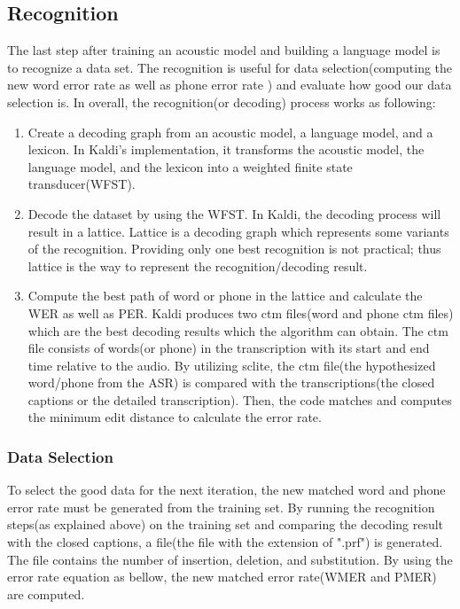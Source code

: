 \subsection{Recognition}
The last step after training an acoustic model and building a language model is to recognize a data set. The recognition is useful for data selection(computing the new word error rate as well as phone error rate ) and evaluate how good our data selection is. In overall, the recognition(or decoding) process works as following:
\begin{enumerate}
\item Create a decoding graph from an acoustic model, a language model, and a lexicon. In Kaldi's implementation, it transforms the  acoustic model, the language model, and the lexicon into a weighted finite state transducer(WFST).
\item Decode the dataset by using the WFST. In Kaldi, the decoding process will result in a lattice. Lattice is a decoding graph which represents some variants of the recognition. Providing only one best recognition is not practical; thus lattice is the way to represent the recognition/decoding result. 
\item Compute the best path of word or phone in the lattice and calculate the WER as well as PER. Kaldi produces two ctm files(word and phone ctm files) which are the best decoding results which the algorithm can obtain. The ctm file consists of words(or phone) in the transcription with its start and end time relative to the audio. By utilizing sclite, the ctm file(the hypothesized word/phone from the ASR) is compared with the transcriptions(the closed captions or the detailed transcription). Then, the code matches and computes the minimum edit distance to calculate the error rate.
\end{enumerate}

\subsubsection{Data Selection}
To select the good data for the next iteration, the new matched word and phone error rate must be generated from the training set. By running the recognition steps(as explained above) on the training set and comparing the decoding result with the closed captions, a file(the file with the extension of ".prf") is generated. The file contains the number of insertion, deletion, and substitution. By using the error rate equation as bellow, the new matched error rate(WMER and PMER) are computed. 

